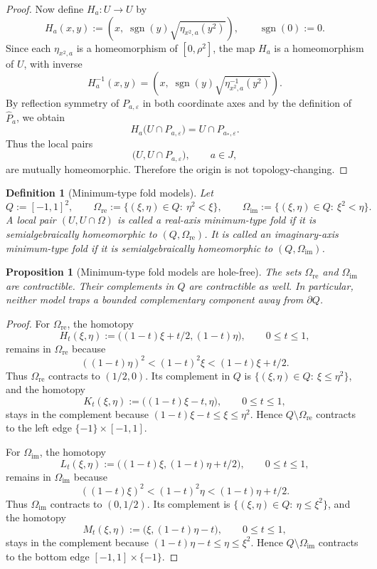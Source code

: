 \documentclass[11pt]{article}
\newtheorem{proposition}[theorem]{Proposition}
\newtheorem{definition}[theorem]{Definition}
\begin{document}
\begin{proof}
Now define \(H_a:U\to U\) by
\[
H_a(x,y)
:=
\left(
x,\;
\operatorname{sgn}(y)\sqrt{\eta_{x^2,a}(y^2)}
\right),
\qquad \operatorname{sgn}(0):=0.
\]
Since each \(\eta_{x^2,a}\) is a homeomorphism of \([0,\rho^2]\), the map \(H_a\) is a homeomorphism of \(U\), with inverse
\[
H_a^{-1}(x,y)
=
\left(
x,\;
\operatorname{sgn}(y)\sqrt{\eta_{x^2,a}^{-1}(y^2)}
\right).
\]
By reflection symmetry of \(P_{a,\varepsilon}\) in both coordinate axes and by the definition of \(\widehat P_a\), we obtain
\[
H_a\bigl(U\cap P_{a,\varepsilon}\bigr)=U\cap P_{a_*,\varepsilon}.
\]
Thus the local pairs
\[
\bigl(U,U\cap P_{a,\varepsilon}\bigr),
\qquad a\in J,
\]
are mutually homeomorphic. Therefore the origin is not topology-changing.
\end{proof}

\begin{definition}[Minimum-type fold models]\label{def:min-fold}
Let
\[
Q:=[-1,1]^2,
\qquad
\Omega_{\mathrm{re}}:=\{(\xi,\eta)\in Q:\ \eta^2<\xi\},
\qquad
\Omega_{\mathrm{im}}:=\{(\xi,\eta)\in Q:\ \xi^2<\eta\}.
\]
A local pair \((U,U\cap\Omega)\) is called a \emph{real-axis minimum-type fold} if it is semialgebraically homeomorphic to \((Q,\Omega_{\mathrm{re}})\). It is called an \emph{imaginary-axis minimum-type fold} if it is semialgebraically homeomorphic to \((Q,\Omega_{\mathrm{im}})\).
\end{definition}

\begin{proposition}[Minimum-type fold models are hole-free]\label{prop:min-fold-hole-free}
The sets \(\Omega_{\mathrm{re}}\) and \(\Omega_{\mathrm{im}}\) are contractible. Their complements in \(Q\) are contractible as well. In particular, neither model traps a bounded complementary component away from \(\partial Q\).
\end{proposition}

\begin{proof}
For \(\Omega_{\mathrm{re}}\), the homotopy
\[
H_t(\xi,\eta):=\bigl((1-t)\xi+t/2,(1-t)\eta\bigr),
\qquad 0\le t\le 1,
\]
remains in \(\Omega_{\mathrm{re}}\) because
\[
((1-t)\eta)^2<(1-t)^2\xi<(1-t)\xi+t/2.
\]
Thus \(\Omega_{\mathrm{re}}\) contracts to \((1/2,0)\). Its complement in \(Q\) is \(\{(\xi,\eta)\in Q:\ \xi\le \eta^2\}\), and the homotopy
\[
K_t(\xi,\eta):=\bigl((1-t)\xi-t,\eta\bigr),
\qquad 0\le t\le 1,
\]
stays in the complement because \((1-t)\xi-t\le \xi\le \eta^2\). Hence \(Q\setminus\Omega_{\mathrm{re}}\) contracts to the left edge \(\{-1\}\times[-1,1]\).

For \(\Omega_{\mathrm{im}}\), the homotopy
\[
L_t(\xi,\eta):=\bigl((1-t)\xi,(1-t)\eta+t/2\bigr),
\qquad 0\le t\le 1,
\]
remains in \(\Omega_{\mathrm{im}}\) because
\[
((1-t)\xi)^2<(1-t)^2\eta<(1-t)\eta+t/2.
\]
Thus \(\Omega_{\mathrm{im}}\) contracts to \((0,1/2)\). Its complement is \(\{(\xi,\eta)\in Q:\ \eta\le \xi^2\}\), and the homotopy
\[
M_t(\xi,\eta):=\bigl(\xi,(1-t)\eta-t\bigr),
\qquad 0\le t\le 1,
\]
stays in the complement because \((1-t)\eta-t\le \eta\le \xi^2\). Hence \(Q\setminus\Omega_{\mathrm{im}}\) contracts to the bottom edge \([-1,1]\times\{-1\}\).
\end{proof}
\end{document}

